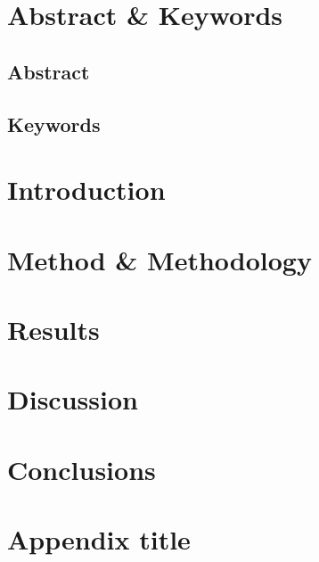 \documentclass{bcrre_lab_report}
\begin{document}

\maketitle

\justifying %

\section*{Abstract \& Keywords}  


\subsection*{Abstract}


\subsection*{Keywords}


\section{Introduction}
\parencite{elliott2014} %


\section{Method \& Methodology}


\section{Results}


\section{Discussion}


\section{Conclusions}


\printbibliography

\appendix
\section{Appendix title}
\end{document}
